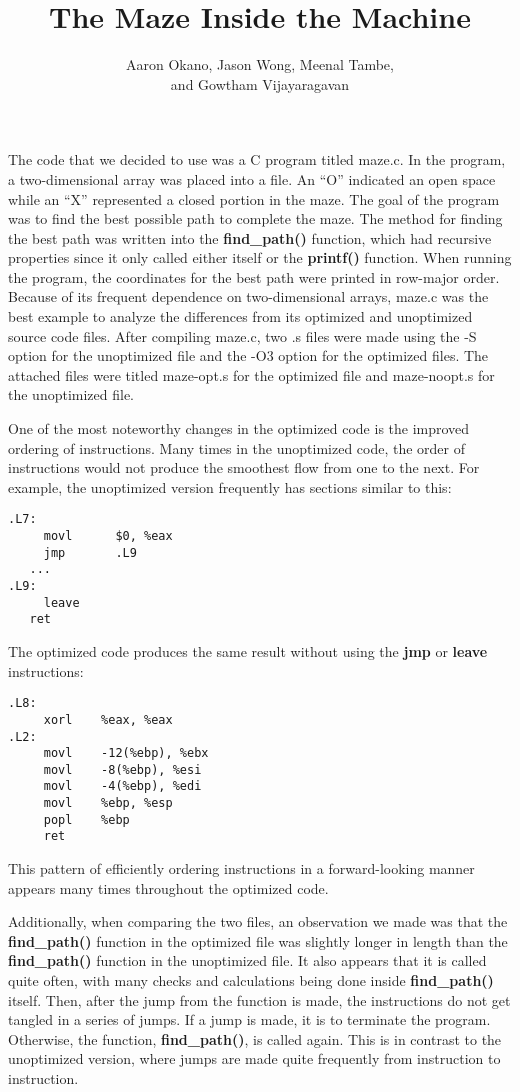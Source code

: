 \documentclass[12pt,letterpaper]{article}
\title{The Maze Inside the Machine}
\author{Aaron Okano, Jason Wong, Meenal Tambe, \\ and Gowtham Vijayaragavan}
\begin{document}
\setcounter{page}{1}
\maketitle

The code that we decided to use was a C program titled maze.c. 
In the program, a two-dimensional array was placed into a file. 
An ``O'' indicated an open space while an ``X'' represented a closed 
portion in the maze. The goal of the program was to find the best 
possible path to complete the maze. The method for finding the 
best path was written into the {\bf find\_path()} function, which had 
recursive properties since it only called either itself or the 
{\bf printf()} function. When running the program, the coordinates 
for the best path were printed in row-major order. Because of 
its frequent dependence on two-dimensional arrays, maze.c was 
the best example to analyze the differences from its optimized 
and unoptimized source code files. After compiling maze.c, two 
.s files were made using the -S option for the unoptimized file 
and the -O3 option for the optimized files. The attached files 
were titled maze-opt.s for the optimized file and maze-noopt.s 
for the unoptimized file.

One of the most noteworthy changes in the optimized code is 
the improved ordering of instructions. Many times in the
unoptimized code, the order of instructions would not produce the
smoothest flow from one to the next. For example, the unoptimized
version frequently has sections similar to this:
\begin{verbatim}
.L7:
	 movl	   $0, %eax
	 jmp	   .L9
   ...
.L9:
 	 leave
   ret
\end{verbatim}
The optimized code produces the same result without using
the {\bf jmp} or {\bf leave} instructions:
\begin{verbatim}
.L8:
 	 xorl    %eax, %eax
.L2:
	 movl    -12(%ebp), %ebx
	 movl    -8(%ebp), %esi
	 movl    -4(%ebp), %edi
	 movl    %ebp, %esp
	 popl    %ebp
	 ret
\end{verbatim}
This pattern of efficiently ordering instructions in a
forward-looking manner appears many times throughout the optimized code.

Additionally, when comparing the two files, an observation we made 
was that the {\bf find\_path()} function in the optimized file was 
slightly longer in length than the {\bf find\_path()} function in the 
unoptimized file. It also appears that it is called quite often, with 
many checks and calculations being done inside {\bf find\_path()} itself. 
Then, after the jump from the function is made, the instructions do 
not get tangled in a series of jumps. If a jump is made, it is to 
terminate the program. Otherwise, the function, {\bf find\_path()}, is 
called again. This is in contrast to the unoptimized version, where 
jumps are made quite frequently from instruction to instruction.
        
\end{document}

